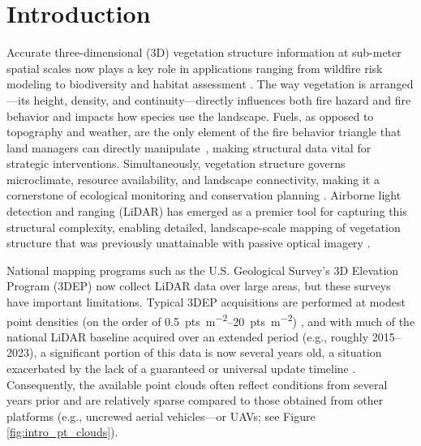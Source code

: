 \documentclass[remotesensing,article,accept,pdftex,moreauthors]{Definitions/mdpi}
\begin{document}



\section{Introduction}

Accurate
 three-dimensional (3D) vegetation structure information at sub-meter spatial scales now plays a key role in applications ranging from wildfire risk modeling \cite{martin-ducup_unlocking_2025} to biodiversity and habitat assessment \cite{Merrick2013Into3D,moudry2023vegetation}. The way vegetation is arranged—its height, density, and continuity—directly influences both fire hazard and fire behavior and impacts how species use the landscape. Fuels, as opposed to topography and weather, are the only element of the fire behavior triangle that land managers can directly \mbox{manipulate \cite{agee_influence_1996}}, making structural data vital for strategic interventions. Simultaneously, vegetation structure governs microclimate, resource availability, and landscape connectivity, making it a cornerstone of ecological monitoring and conservation planning \cite{guo2018integrating, mahata2023microclimate,ustin2021current}. Airborne light detection and ranging (LiDAR) has emerged as a premier tool for capturing this structural complexity, enabling detailed, landscape-scale mapping of vegetation structure that was previously unattainable with passive optical imagery \cite{Merrick2013Into3D, belov2019capabilities, guo2020lidar}.

National mapping programs such as the U.S. Geological Survey's 3D Elevation Program (3DEP) now collect LiDAR data over large areas, but these surveys have important limitations. Typical 3DEP acquisitions are performed at modest point densities (on the order of \qtyrange{0.5}{20}{pts\per\square\meter}) \cite{wu2016evaluating}, and with much of the national LiDAR baseline acquired over an extended period (e.g., roughly 2015--2023), a significant portion of this data is now several years old, a situation exacerbated by the lack of a guaranteed or universal update timeline \cite{usgs_what_2019}. Consequently, the available point clouds often reflect conditions from several years prior and are relatively sparse compared to those obtained from other platforms (e.g., uncrewed aerial vehicles---or UAVs; see Figure \ref{fig:intro_pt_clouds}).
\end{document}
